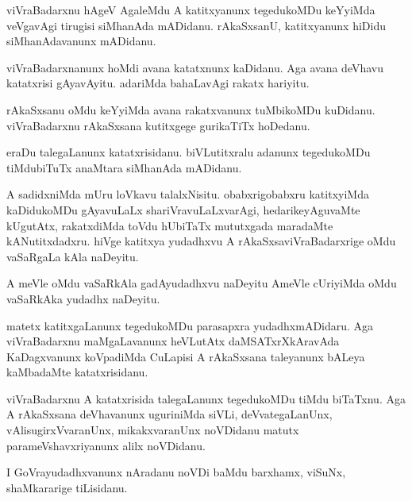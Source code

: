 \documentclass{article}
\begin{document}
\begin{mn}
viVraBadarxnu  hAgeV  AgaleMdu  A  katitxyanunx  tegedukoMDu  keYyiMda  veVgavAgi  tirugisi  siMhanAda  mADidanu.  
rAkaSxsanU,  katitxyanunx  hiDidu  siMhanAdavanunx  mADidanu.
\end{mn}

\begin{mn}
viVraBadarxnanunx  hoMdi  avana  katatxnunx  kaDidanu.  Aga  avana  deVhavu  katatxrisi  gAyavAyitu.  adariMda  
bahaLavAgi  rakatx  hariyitu.
\end{mn}

\begin{mn}
rAkaSxsanu  oMdu  keYyiMda  avana  rakatxvanunx  tuMbikoMDu  kuDidanu.  viVraBadarxnu  rAkaSxsana  kutitxgege  gurikaTiTx  hoDedanu.
\end{mn}

\begin{mn}
eraDu  talegaLanunx  katatxrisidanu.  biVLutitxralu  adanunx  tegedukoMDu  tiMdubiTuTx  anaMtara  siMhanAda  mADidanu.
\end{mn}

\begin{mn}
A  sadidxniMda  mUru  loVkavu  talalxNisitu.  obabxrigobabxru  katitxyiMda  kaDidukoMDu  gAyavuLaLx  shariVravuLaLxvarAgi,  
hedarikeyAguvaMte  kUgutAtx,  rakatxdiMda  toVdu  hUbiTaTx  mututxgada  maradaMte  kANutitxdadxru.  hiVge  katitxya  yudadhxvu  
A  rAkaSxsaviVraBadarxrige  oMdu  vaSaRgaLa  kAla  naDeyitu.
\end{mn}

\begin{mn}
A meVle  oMdu  vaSaRkAla  gadAyudadhxvu  naDeyitu  AmeVle  cUriyiMda  oMdu  vaSaRkAka  yudadhx  naDeyitu.
\end{mn}

\begin{mn}
matetx  katitxgaLanunx  tegedukoMDu  parasapxra  yudadhxmADidaru.  Aga  viVraBadarxnu  maMgaLavanunx  heVLutAtx  
daMSATxrXkAravAda  KaDagxvanunx  koVpadiMda  CuLapisi  A  rAkaSxsana  taleyanunx  bALeya  kaMbadaMte  katatxrisidanu.
\end{mn}

\begin{mn}
viVraBadarxnu  A  katatxrisida  talegaLanunx  tegedukoMDu  tiMdu biTaTxnu.  Aga  A  rAkaSxsana  deVhavanunx  uguriniMda  
siVLi,  deVvategaLanUnx,  vAlisugirxVvaranUnx,  mikakxvaranUnx  noVDidanu  matutx  parameVshavxriyanunx  alilx  noVDidanu.
\end{mn}

\begin{mn}
I  GoVrayudadhxvanunx  nAradanu  noVDi  baMdu  barxhamx,  viSuNx,  shaMkararige  tiLisidanu.
\end{mn}
\end{document}
